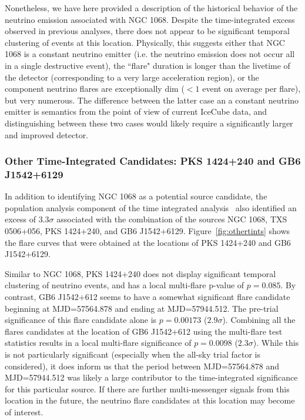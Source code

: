 Nonetheless, we have here provided a description of the historical behavior of the neutrino emission associated with NGC 1068. Despite the time-integrated excess observed in previous analyses, there does not appear to be significant temporal clustering of events at this location. Physically, this suggests either that NGC 1068 is a constant neutrino emitter (i.e. the neutrino emission does not occur all in a single destructive event), the ``flare" duration is longer than the livetime of the detector (corresponding to a very large acceleration region), or the component neutrino flares are exceptionally dim ($< 1$ event on average per flare), but very numerous. The difference between the latter case an a constant neutrino emitter is semantics from the point of view of current IceCube data, and distinguishing between these two cases would likely require a significantly larger and improved detector.  

\subsubsection{Other Time-Integrated Candidates: PKS 1424+240  and GB6 J1542+6129}
In addition to identifying NGC 1068 as a potential source candidate, the population analysis component of the time integrated analysis~\cite{10yr_tint} also identified an excess of $3.3 \sigma$ associated with the combination of the sources NGC 1068, TXS 0506+056, PKS 1424+240, and GB6 J1542+6129. Figure~\ref{fig:othertints} shows the flare curves that were obtained at the locations of PKS 1424+240 and GB6 J1542+6129. 

Similar to NGC 1068, PKS 1424+240 does not display significant temporal clustering of neutrino events, and has a local multi-flare p-value of $p=0.085$. By contrast, GB6 J1542+612 seems to have a somewhat significant flare candidate beginning at MJD=57564.878 and ending at MJD=57944.512. The pre-trial significance of this flare candidate alone is $p=0.00173$ ($2.9 \sigma$). Combining all the flares candidates at the location of GB6 J1542+612 using the multi-flare test statistics results in a local multi-flare significance of $p=0.0098$ ($2.3 \sigma$). While this is not particularly significant (especially when the all-sky trial factor is considered), it does inform us that the period between MJD=57564.878 and MJD=57944.512 was likely a large contributor to the time-integrated significance for this particular source. If there are further multi-messenger signals from this location in the future, the neutrino flare candidates at this location may become of interest. 

